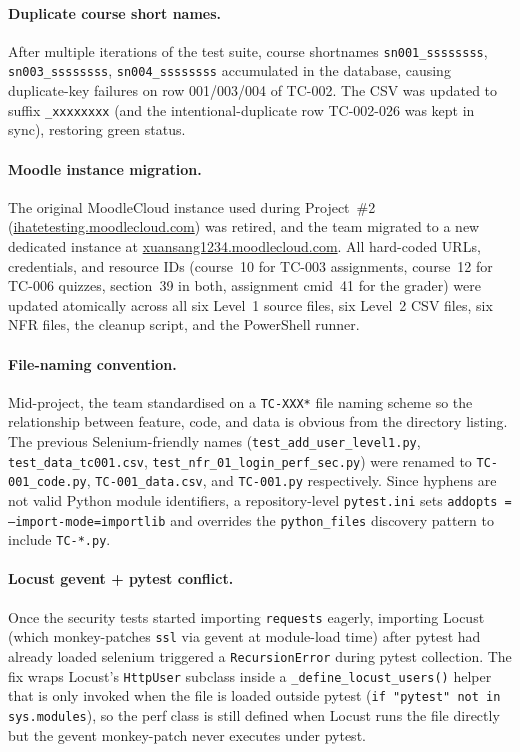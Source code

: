 \documentclass[twoside,final]{hcmut-report}
\begin{document}
\paragraph{Duplicate course short names.}
After multiple iterations of the test suite, course shortnames \texttt{sn001\_ssssssss}, \texttt{sn003\_ssssssss}, \texttt{sn004\_ssssssss} accumulated in the database, causing duplicate-key failures on row 001/003/004 of TC-002. The CSV was updated to suffix \texttt{\_xxxxxxxx} (and the intentional-duplicate row TC-002-026 was kept in sync), restoring green status.

\paragraph{Moodle instance migration.}
The original MoodleCloud instance used during Project~\#2 (\url{ihatetesting.moodlecloud.com}) was retired, and the team migrated to a new dedicated instance at \url{xuansang1234.moodlecloud.com}. All hard-coded URLs, credentials, and resource IDs (course~10 for TC-003 assignments, course~12 for TC-006 quizzes, section~39 in both, assignment cmid~41 for the grader) were updated atomically across all six Level~1 source files, six Level~2 CSV files, six NFR files, the cleanup script, and the PowerShell runner.

\paragraph{File-naming convention.}
Mid-project, the team standardised on a \texttt{TC-XXX*} file naming scheme so the relationship between feature, code, and data is obvious from the directory listing. The previous Selenium-friendly names (\texttt{test\_add\_user\_level1.py}, \texttt{test\_data\_tc001.csv}, \texttt{test\_nfr\_01\_login\_perf\_sec.py}) were renamed to \texttt{TC-001\_code.py}, \texttt{TC-001\_data.csv}, and \texttt{TC-001.py} respectively. Since hyphens are not valid Python module identifiers, a repository-level \texttt{pytest.ini} sets \texttt{addopts = --import-mode=importlib} and overrides the \texttt{python\_files} discovery pattern to include \texttt{TC-*.py}.

\paragraph{Locust gevent + pytest conflict.}
Once the security tests started importing \texttt{requests} eagerly, importing Locust (which monkey-patches \texttt{ssl} via gevent at module-load time) after pytest had already loaded selenium triggered a \texttt{RecursionError} during pytest collection. The fix wraps Locust's \texttt{HttpUser} subclass inside a \texttt{\_define\_locust\_users()} helper that is only invoked when the file is loaded outside pytest (\texttt{if "pytest" not in sys.modules}), so the perf class is still defined when Locust runs the file directly but the gevent monkey-patch never executes under pytest.
\end{document}
